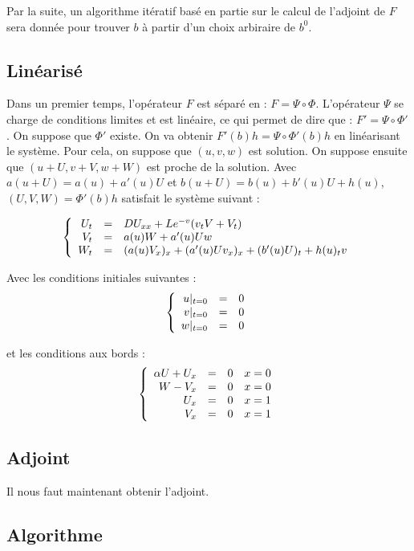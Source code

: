 \documentclass[a4paper,10pt]{article}
\begin{document}
Par la suite, un algorithme itératif basé en partie sur le calcul de l'adjoint de $F$ sera donnée pour trouver $b$ à partir d'un choix arbiraire de $b^0$.

\subsection{Linéarisé}

Dans un premier temps, l'opérateur $F$ est séparé en : $F=\Psi \circ  \Phi$. L'opérateur $\Psi$ se charge de conditions limites et est linéaire, ce qui permet de dire que : $F'=\Psi \circ  \Phi '$. On suppose que $\Phi '$ existe.
On va obtenir $F'(b)h=\Psi \circ  \Phi'(b) h$ en linéarisant le système. Pour cela, on suppose que $(u,v,w)$ est solution. On suppose ensuite que $(u+U, v+V, w+W)$ est proche de la solution. Avec $a(u+U)=a(u)+a'(u)U$ et $b(u+U)=b(u)+b'(u)U+h(u)$, $(U,V,W)=\Phi'(b) h$ satisfait le système suivant :

\[
\left\{
\begin{array}{r c l}
U_t		&=&		D U_{xx} + L e^{-v} (v_t V +V_t)		\\
V_t		&=&		a(u)W + a'(u)Uw						\\
W_t		&=&		(a(u)V_x)_x + (a'(u)Uv_x)_x + (b'(u)U)_t + h(u)_t v\\
\end{array}
\right.
\]

Avec les conditions initiales suivantes :
\[
\left\{
\begin{array}{r c l}
u|_{t=0}		&=&		0		\\
v|_{t=0}		&=&		0		\\
w|_{t=0}		&=&		0		\\
\end{array}
\right.
\]

et les conditions aux bords :
\[
\left\{
\begin{array}{r c l c r}
\alpha U + U_x	&=&		0 	&	x = 0\\
W		- V_x 	&=&		0	&	x = 0\\
U_x	&=&		0 	&	x = 1\\
V_x 	&=&		0	&	x = 1\\
\end{array}
\right.
\]

\subsection{Adjoint}
Il nous faut maintenant obtenir l'adjoint.

\subsection{Algorithme}
\end{document}
